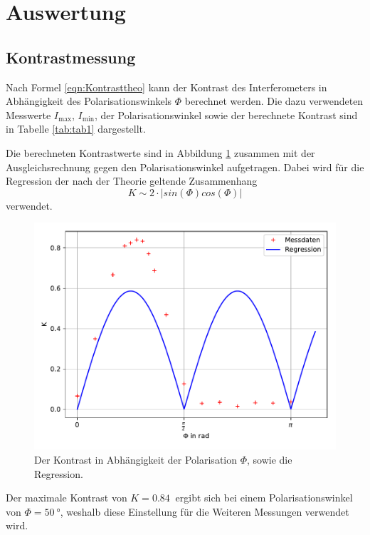 \section{Auswertung}
\subsection{Kontrastmessung}

Nach Formel \ref{eqn:Kontrasttheo} kann der Kontrast des Interferometers in Abhängigkeit des Polarisationswinkels $\Phi$
berechnet werden. Die dazu verwendeten Messwerte $I_{\text{max}}$, $I_{\text{min}}$, der Polarisationswinkel sowie
der berechnete Kontrast sind in Tabelle \ref{tab:tab1} dargestellt.



Die berechneten Kontrastwerte sind in Abbildung \ref{fig:Kontrast} zusammen mit der Ausgleichsrechnung
gegen den Polarisationswinkel aufgetragen. Dabei wird für die Regression der nach der Theorie geltende Zusammenhang
\begin{equation}
  K\sim 2\cdot|sin(\Phi)cos(\Phi)|
\end{equation}
verwendet.

\begin{figure}[H]
  \centering
  \includegraphics[width=12cm]{Kontrast.png}
  \caption{Der Kontrast in Abhängigkeit der Polarisation $\Phi$, sowie die Regression.}
  \label{fig:Kontrast}
\end{figure}

Der maximale Kontrast von $K=\SI{0,84}{}$ ergibt sich bei einem Polarisationswinkel von $\Phi=\SI{50}{\degree}$,
weshalb diese Einstellung für die Weiteren Messungen verwendet wird.

